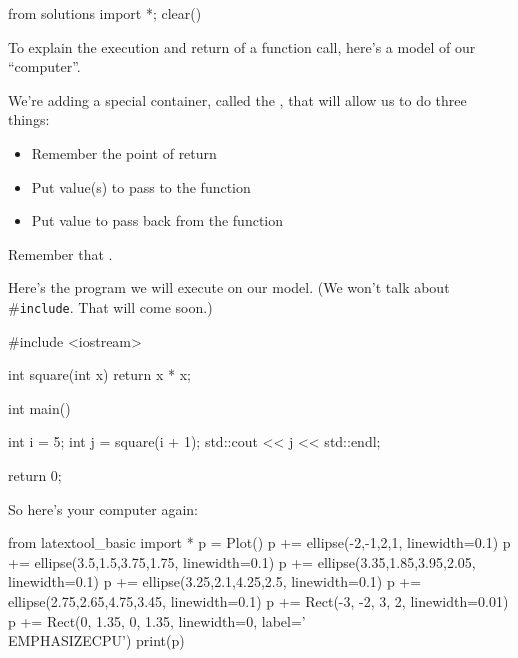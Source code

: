 \begin{python0}
from solutions import *; clear()
\end{python0}

To explain the execution and return of a function call, here's a model of our ``computer''.

We're adding a special container, called the , that will allow us to do three things:

\begin{itemize}
\item Remember the point of return
\item Put value(s) to pass to the function
\item Put value to pass back from the function
\end{itemize}

Remember that .

Here's the program we will execute on our model. (We won't talk about \#\verb!include!. That will come soon.)

\begin{consolethree}[escapeinside=||]
#include <iostream>

int square(int x)
{
    return x * x;
}

int main()
{
    int i = 5;
    int j = square(i + 1);
    std::cout << j << std::endl;

    return 0;
}
\end{consolethree}
So here's your computer again:
\begin{python}
from latextool_basic import *
p = Plot()
p += ellipse(-2,-1,2,1, linewidth=0.1)
p += ellipse(3.5,1.5,3.75,1.75, linewidth=0.1)
p += ellipse(3.35,1.85,3.95,2.05, linewidth=0.1)
p += ellipse(3.25,2.1,4.25,2.5, linewidth=0.1)
p += ellipse(2.75,2.65,4.75,3.45, linewidth=0.1)
p += Rect(-3, -2, 3, 2, linewidth=0.01)
p += Rect(0, 1.35, 0, 1.35, linewidth=0, label='\\EMPHASIZE{CPU}')
print(p)
\end{python}

\newpage

